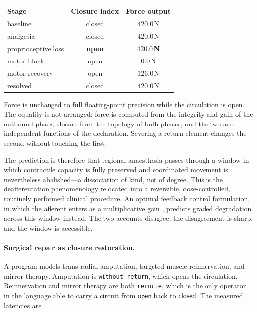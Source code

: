 \documentclass[11pt,twocolumn,a4paper]{article}
\theoremstyle{thmstyle}
\theoremstyle{definition}
\theoremstyle{remark}
\begin{document}
\begin{center}
\begin{tabular}{@{}lcc@{}}
\toprule
Stage & Closure index & Force output\\
\midrule
baseline            & closed        & $420.0$\,N\\
analgesia           & closed        & $420.0$\,N\\
proprioceptive loss & \textbf{open} & $\mathbf{420.0}$\,\textbf{N}\\
motor block         & open          & $0.0$\,N\\
motor recovery      & open          & $126.0$\,N\\
resolved            & closed        & $420.0$\,N\\
\bottomrule
\end{tabular}
\end{center}

Force is unchanged to full floating-point precision while the circulation is
open. The equality is not arranged: force is computed from the integrity and
gain of the outbound phase, closure from the topology of both phases, and
the two are independent functions of the declaration. Severing a return
element changes the second without touching the first.

The prediction is therefore that regional anaesthesia passes through a
window in which contractile capacity is fully preserved and coordinated
movement is nevertheless abolished---a dissociation of kind, not of degree.
This is the deafferentation phenomenology
\citep{cole1991,sainburg1995,ghez1995,lajoie1996} relocated into a
reversible, dose-controlled, routinely performed clinical procedure. An
optimal feedback control formulation, in which the afferent enters as a
multiplicative gain \citep{todorov2002}, predicts graded degradation across
this window instead. The two accounts disagree, the disagreement is sharp,
and the window is accessible.

\paragraph{Surgical repair as closure restoration.}
A program models trans-radial amputation, targeted muscle reinnervation, and
mirror therapy. Amputation is \texttt{without return}, which opens the
circulation. Reinnervation and mirror therapy are both \texttt{reroute},
which is the only operator in the language able to carry a circuit from
$\textsf{open}$ back to $\textsf{closed}$. The measured latencies are
\end{document}
